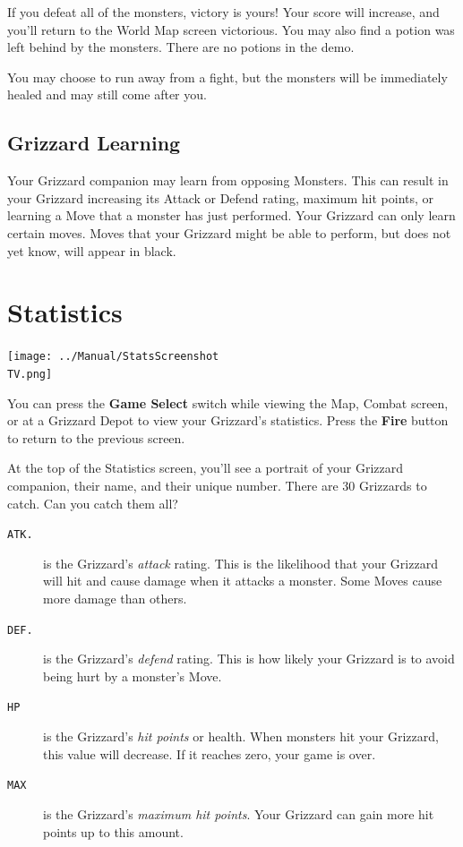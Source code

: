 \documentclass[10pt,twocolumn,openany,article]{memoir}
\newcommand\TV{NTSC}
\newcommand\TV{PAL}
\newcommand\TV{SECAM}
\begin{document}
If you  defeat all of  the monsters, victory  is yours! Your  score will
increase, and you'll return to the  World Map screen victorious. You may
also find a potion was left behind by the monsters. \ifdefined\DEMO\else
There are no potions in the demo. \fi

You  may choose  to run  away from  a fight,  but the  monsters will  be
immediately healed and may still come after you.

\subsection{Grizzard Learning}

Your  Grizzard companion  may  learn from  opposing  Monsters. This  can
result in your Grizzard increasing  its Attack or Defend rating, maximum
hit  points, or  learning  a Move  that a  monster  has just  performed.
Your Grizzard  can only  learn certain moves.  Moves that  your Grizzard
might be able to perform, but does not yet know, will appear in black.

\section{Statistics}

\begin{center}
  \texttt{[image: ../Manual/StatsScreenshot\\TV.png]}
\end{center}

You can  press the  \textbf{Game Select} switch  while viewing  the Map,
Combat  screen,  or  at  a   Grizzard  Depot  to  view  your  Grizzard's
statistics.   Press  the   \textbf{Fire}   button  to   return  to   the
previous screen.

At  the top  of the  Statistics screen,  you'll see  a portrait  of your
Grizzard companion,  their name, and  their unique number. There  are 30
Grizzards to catch. Can you catch them all?

\begin{description}
  
\item[\texttt{ATK.}] is the Grizzard's  \emph{attack} rating. This is the
  likelihood  that your  Grizzard  will  hit and  cause  damage when  it
  attacks a monster. Some Moves cause more damage than others.
  
\item[\texttt{DEF.}] is the Grizzard's  \emph{defend} rating. This is how
  likely your Grizzard is to avoid being hurt by a monster's Move.

\item[\texttt{HP}]  is  the  Grizzard's  \emph{hit  points}  or  health.
  When  monsters hit  your Grizzard,  this  value will  decrease. If  it
  reaches zero, your game is over.

\item[\texttt{MAX}]  is   the  Grizzard's  \emph{maximum   hit  points}.
  Your Grizzard can gain more hit points up to this amount.
  
\end{description}
\end{document}
